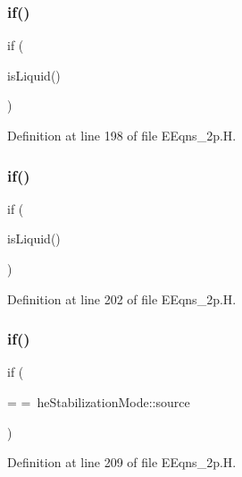 \subsubsection{\texorpdfstring{if()}{if()}\hspace{0.1cm}{\footnotesize\ttfamily [6/8]}}
{\footnotesize\ttfamily if (\begin{DoxyParamCaption}\item[{fluid1\+\_\+.}]{is\+Liquid() }\end{DoxyParamCaption})}



Definition at line 198 of file E\+Eqns\+\_\+2p.\+H.

\mbox{\label{EEqns__2p_8H_a9fbb44a037f6db834ade28d6a2737228}} 
\subsubsection{\texorpdfstring{if()}{if()}\hspace{0.1cm}{\footnotesize\ttfamily [7/8]}}
{\footnotesize\ttfamily if (\begin{DoxyParamCaption}\item[{fluid2\+\_\+.}]{is\+Liquid() }\end{DoxyParamCaption})}



Definition at line 202 of file E\+Eqns\+\_\+2p.\+H.

\mbox{\label{EEqns__2p_8H_a5d38b537890f4fed230a851bae818010}} 
\subsubsection{\texorpdfstring{if()}{if()}\hspace{0.1cm}{\footnotesize\ttfamily [8/8]}}
{\footnotesize\ttfamily if (\begin{DoxyParamCaption}\item[{he\+Stabilization\+Mode\+\_\+}]{ = {\ttfamily =~heStabilizationMode\+:\+:source} }\end{DoxyParamCaption})}



Definition at line 209 of file E\+Eqns\+\_\+2p.\+H.



